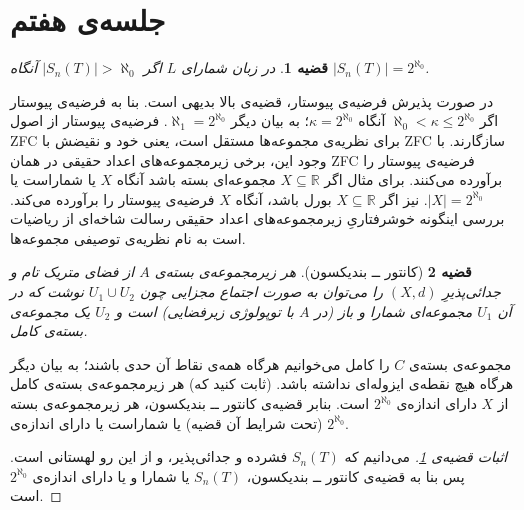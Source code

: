 \documentclass[12pt,a4paper]{report}
\theoremstyle{colorhead}
\newtheorem{thm}{قضیه}
\begin{document}
\section{جلسه‌ی هفتم}
\begin{thm}
\label{andazeyefazayetype}
در زبان شمارای 
$L$
اگر
$|S_n(T)|>\aleph_0$
آنگاه
$|S_n(T)|=2^{\aleph_0}$.
\end{thm}
در صورت پذیرش فرضیه‌ی پیوستار، قضیه‌ی بالا بدیهی است. بنا به فرضیه‌ی پیوستار اگر
$\aleph_0<\kappa\leq  2^{\aleph_0}$
آنگاه 
$\kappa=2^{\aleph_0}$؛
به بیان دیگر
$\aleph_1=2^{\aleph_0}$.
فرضیه‌ی پیوستار از اصول
ZFC
برای نظریه‌ی مجموعه‌ها مستقل است، یعنی خود و نقیضش با
ZFC
سازگارند. با وجود این، برخی زیرمجموعه‌های اعداد حقیقی در همان
ZFC
فرضیه‌ی پیوستار را برآورده می‌کنند. برای مثال اگر
$X\subseteq \mathbb{R}$
مجموعه‌ای بسته باشد آنگاه
$X$
یا شماراست یا
$|X|=2^{\aleph_0}$.
نیز اگر
$X\subseteq \mathbb{R}$
بورل باشد، آنگاه 
$X$
فرضیه‌ی پیوستار را برآورده می‌کند. بررسی اینگونه خوشرفتاریِ زیرمجموعه‌های اعداد حقیقی
رسالت شاخه‌ای از ریاضیات است به نام 
نظریه‌ی توصیفی مجموعه‌ها.
\begin{thm}[کانتور ــ‌ بندیکسون]
هر زیرمجموعه‌ی بسته‌ی
$A$
از فضای متریک تام 
و جدائی‌پذیرِ
$(X,d)$
را می‌توان به صورت
اجتماع مجزایی چون
$U_1\cup U_2$
نوشت که در آن
$U_1$
مجموعه‌ای شمارا و باز (در
$A$
با توپولوژی زیرفضایی)‌ است و 
$U_2$
یک مجموعه‌ی بسته‌ی 
کامل.
\end{thm}
مجموعه‌ی بسته‌ی
$C$
را کامل می‌خوانیم هرگاه همه‌ی نقاط آن حدی باشند؛  به بیان دیگر هرگاه هیچ نقطه‌ی ایزوله‌ای نداشته باشد. (ثابت کنید که) هر زیرمجموعه‌ی بسته‌ی کامل از
$X$
دارای اندازه‌ی
$2^{\aleph_0}$
است. بنابر قضیه‌ی کانتور ــ‌ بندیکسون، 
هر زیرمجموعه‌ی بسته‌ (تحت شرایط آن قضیه)‌ یا
شماراست یا دارای اندازه‌ی 
$2^{\aleph_0}$.
\begin{proof}[اثبات قضیه‌ی
\ref{andazeyefazayetype}
]
می‌دانیم که
$S_n(T)$
فشرده و جدائی‌پذیر، و از این رو لهستانی است. پس بنا به قضیه‌ی کانتور ــ‌ بندیکسون،
$S_n(T)$
یا شمارا و  یا دارای اندازه‌ی
$2^{\aleph_0}$
است.
\end{proof}
\end{document}
